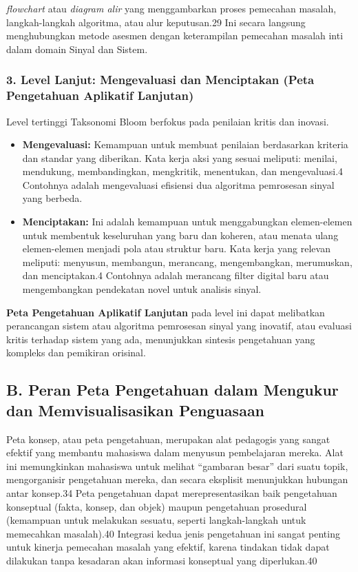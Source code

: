 \documentclass[
  letterpaper,
  DIV=11,
  numbers=noendperiod]{scrreprt}
\begin{document}
\emph{flowchart} atau \emph{diagram alir} yang menggambarkan proses
pemecahan masalah, langkah-langkah algoritma, atau alur keputusan.29 Ini
secara langsung menghubungkan metode asesmen dengan keterampilan
pemecahan masalah inti dalam domain Sinyal dan Sistem.

\subsubsection{3. Level Lanjut: Mengevaluasi dan Menciptakan (Peta
Pengetahuan Aplikatif
Lanjutan)}\label{level-lanjut-mengevaluasi-dan-menciptakan-peta-pengetahuan-aplikatif-lanjutan}

Level tertinggi Taksonomi Bloom berfokus pada penilaian kritis dan
inovasi.

\begin{itemize}
\item
  \textbf{Mengevaluasi:} Kemampuan untuk membuat penilaian berdasarkan
  kriteria dan standar yang diberikan. Kata kerja aksi yang sesuai
  meliputi: menilai, mendukung, membandingkan, mengkritik, menentukan,
  dan mengevaluasi.4 Contohnya adalah mengevaluasi efisiensi dua
  algoritma pemrosesan sinyal yang berbeda.
\item
  \textbf{Menciptakan:} Ini adalah kemampuan untuk menggabungkan
  elemen-elemen untuk membentuk keseluruhan yang baru dan koheren, atau
  menata ulang elemen-elemen menjadi pola atau struktur baru. Kata kerja
  yang relevan meliputi: menyusun, membangun, merancang, mengembangkan,
  merumuskan, dan menciptakan.4 Contohnya adalah merancang filter
  digital baru atau mengembangkan pendekatan novel untuk analisis
  sinyal.
\end{itemize}

\textbf{Peta Pengetahuan Aplikatif Lanjutan} pada level ini dapat
melibatkan perancangan sistem atau algoritma pemrosesan sinyal yang
inovatif, atau evaluasi kritis terhadap sistem yang ada, menunjukkan
sintesis pengetahuan yang kompleks dan pemikiran orisinal.

\subsection{B. Peran Peta Pengetahuan dalam Mengukur dan
Memvisualisasikan
Penguasaan}\label{b.-peran-peta-pengetahuan-dalam-mengukur-dan-memvisualisasikan-penguasaan}

Peta konsep, atau peta pengetahuan, merupakan alat pedagogis yang sangat
efektif yang membantu mahasiswa dalam menyusun pembelajaran mereka. Alat
ini memungkinkan mahasiswa untuk melihat ``gambaran besar'' dari suatu
topik, mengorganisir pengetahuan mereka, dan secara eksplisit
menunjukkan hubungan antar konsep.34 Peta pengetahuan dapat
merepresentasikan baik pengetahuan konseptual (fakta, konsep, dan objek)
maupun pengetahuan prosedural (kemampuan untuk melakukan sesuatu,
seperti langkah-langkah untuk memecahkan masalah).40 Integrasi kedua
jenis pengetahuan ini sangat penting untuk kinerja pemecahan masalah
yang efektif, karena tindakan tidak dapat dilakukan tanpa kesadaran akan
informasi konseptual yang diperlukan.40
\end{document}
